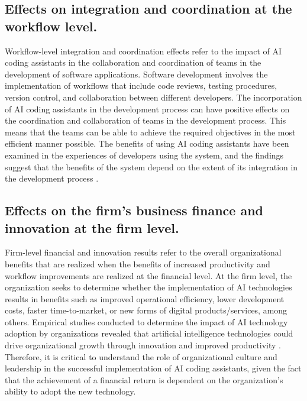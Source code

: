 \subsection {Effects on integration and coordination at the workflow level.}
\label{sec:Effects on integration and coordination at the workflow level}
Workflow-level integration and coordination effects refer to the impact of AI coding assistants in the collaboration and coordination of teams in the development of software applications. Software development involves the implementation of workflows that include code reviews, testing procedures, version control, and collaboration between different developers. The incorporation of AI coding assistants in the development process can have positive effects on the coordination and collaboration of teams in the development process. This means that the teams can be able to achieve the required objectives in the most efficient manner possible. The benefits of using AI coding assistants have been examined in the experiences of developers using the system, and the findings suggest that the benefits of the system depend on the extent of its integration in the development process \autocite{Sergeyuk2025}.

\subsection {Effects on the firm's business finance and innovation at the firm level.}
\label{sec:Effects on the firm's business finance and innovation at the firm level}
Firm-level financial and innovation results refer to the overall organizational benefits that are realized when the benefits of increased productivity and workflow improvements are realized at the financial level. At the firm level, the organization seeks to determine whether the implementation of AI technologies results in benefits such as improved operational efficiency, lower development costs, faster time-to-market, or new forms of digital products/services, among others. Empirical studies conducted to determine the impact of AI technology adoption by organizations revealed that artificial intelligence technologies could drive organizational growth through innovation and improved productivity \autocite{Babina2024}. Therefore, it is critical to understand the role of organizational culture and leadership in the successful implementation of AI coding assistants, given the fact that the achievement of a financial return is dependent on the organization’s ability to adopt the new technology.

